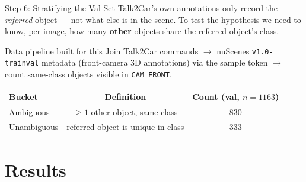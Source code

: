 \documentclass[aspectratio=169]{beamer}
\begin{document}
\begin{frame}{Step 6: Stratifying the Val Set}
  Talk2Car's own annotations only record the \emph{referred} object —
  not what else is in the scene. To test the hypothesis we need to
  know, per image, how many \textbf{other} objects share the referred
  object's class.

  \begin{block}{Data pipeline built for this}
    Join Talk2Car commands $\to$ nuScenes \texttt{v1.0-trainval}
    metadata (front-camera 3D annotations) via the sample token $\to$
    count same-class objects visible in \texttt{CAM\_FRONT}.
  \end{block}

  \begin{table}
    \centering\small
    \begin{tabular}{lcc}
      \toprule
      Bucket & Definition & Count (val, $n{=}1163$) \\
      \midrule
      Ambiguous & $\geq 1$ other object, same class & 830 \\
      Unambiguous & referred object is unique in class & 333 \\
      \bottomrule
    \end{tabular}
  \end{table}
\end{frame}

\section{Results}
\end{document}
